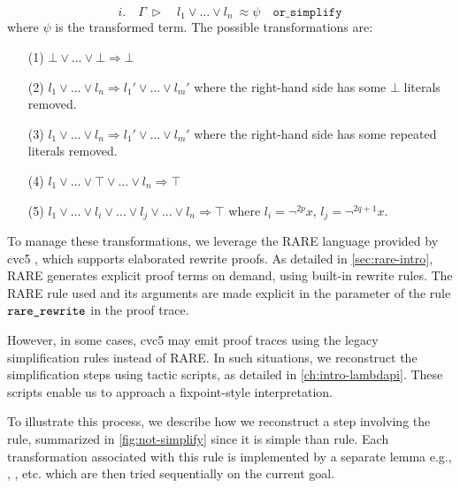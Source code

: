 \begin{equation}\label{eqn:or-simp}
i. \quad \Gamma~\triangleright \quad l_1 \lor \dots \lor l_n ~ \approx \psi \quad \texttt{or\_simplify}
\end{equation}
where $\psi$ is the transformed term. The possible transformations are:
\begin{enumerate}
\item[(1)] $\bot \lor \dots \lor \bot \Rightarrow \bot$
\item[(2)] $l_1 \lor \dots \lor l_n \Rightarrow l_1' \lor \dots \lor l_m'$ where the right-hand side has some $\bot$ literals removed.
\item[(3)]  $l_1 \lor \dots \lor l_n \Rightarrow l_1' \lor \dots \lor l_m'$ where the right-hand side has some repeated literals removed.
\item[(4)] $l_1 \lor \dots \lor \top \lor \dots \lor l_n \Rightarrow \top$
\item[(5)] $l_1 \lor \dots \lor l_i \lor \dots \lor l_j \lor \dots \lor  l_n \Rightarrow \top$ where $l_i = \neg^{2p} x$, $l_j = \neg^{2q+1} x$.
\end{enumerate}

To manage these transformations, we leverage the RARE language provided by cvc5 \cite{rare}, which supports elaborated rewrite proofs.
As detailed in \cref{sec:rare-intro}, RARE generates explicit proof terms on demand, using built-in rewrite rules.
The RARE rule used and its arguments are made explicit in the  parameter of the rule $\texttt{\upshape{rare\_rewrite}}$ in the proof trace.

However, in some cases, cvc5 may emit proof traces using the legacy simplification rules instead of RARE. In such situations, we reconstruct the simplification steps using tactic scripts, as detailed in \cref{ch:intro-lambdapi}.
These scripts enable us to approach a fixpoint-style interpretation.

To illustrate this process, we describe how we reconstruct a step involving the  rule, summarized in \cref{fig:not-simplify} since it is simple than  rule.
Each transformation associated with this rule is implemented by a separate lemma e.g., , , etc. which are then tried sequentially on the current goal.

